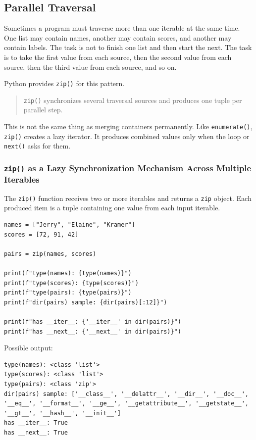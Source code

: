 \subsection{Parallel Traversal}

Sometimes a program must traverse more than one iterable at the same time. One list may contain names, another may contain scores, and another may contain labels. The task is not to finish one list and then start the next. The task is to take the first value from each source, then the second value from each source, then the third value from each source, and so on.

Python provides \texttt{zip()} for this pattern.

\begin{quote}
\texttt{zip()} synchronizes several traversal sources and produces one tuple per parallel step.
\end{quote}

This is not the same thing as merging containers permanently. Like \texttt{enumerate()}, \texttt{zip()} creates a lazy iterator. It produces combined values only when the loop or \texttt{next()} asks for them.

\subsubsection{\texttt{zip()} as a Lazy Synchronization Mechanism Across Multiple Iterables}

The \texttt{zip()} function receives two or more iterables and returns a \texttt{zip} object. Each produced item is a tuple containing one value from each input iterable.

\begin{verbatim}
names = ["Jerry", "Elaine", "Kramer"]
scores = [72, 91, 42]

pairs = zip(names, scores)

print(f"type(names): {type(names)}")
print(f"type(scores): {type(scores)}")
print(f"type(pairs): {type(pairs)}")
print(f"dir(pairs) sample: {dir(pairs)[:12]}")

print(f"has __iter__: {'__iter__' in dir(pairs)}")
print(f"has __next__: {'__next__' in dir(pairs)}")
\end{verbatim}

Possible output:

\begin{verbatim}
type(names): <class 'list'>
type(scores): <class 'list'>
type(pairs): <class 'zip'>
dir(pairs) sample: ['__class__', '__delattr__', '__dir__', '__doc__',
'__eq__', '__format__', '__ge__', '__getattribute__', '__getstate__',
'__gt__', '__hash__', '__init__']
has __iter__: True
has __next__: True
\end{verbatim}

